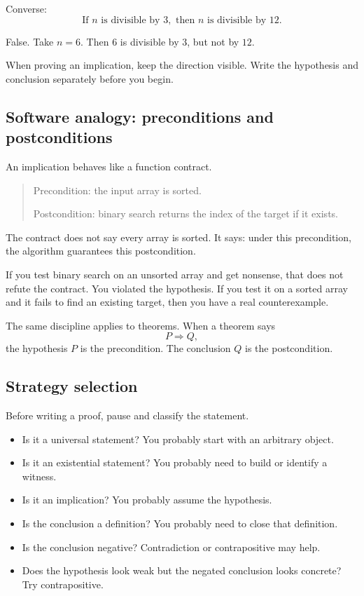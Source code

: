 Converse:
\[
\text{If }n\text{ is divisible by }3,\text{ then }n\text{ is divisible by }12.
\]

False. Take $n=6$. Then $6$ is divisible by $3$, but not by $12$.

\begin{trapbox}
When proving an implication, keep the direction visible. Write the hypothesis and conclusion separately before you begin.
\end{trapbox}

\subsection{Software analogy: preconditions and postconditions}

An implication behaves like a function contract.

\begin{quote}
Precondition: the input array is sorted.

Postcondition: binary search returns the index of the target if it exists.
\end{quote}

The contract does not say every array is sorted. It says: under this precondition, the algorithm guarantees this postcondition.

If you test binary search on an unsorted array and get nonsense, that does not refute the contract. You violated the hypothesis. If you test it on a sorted array and it fails to find an existing target, then you have a real counterexample.

The same discipline applies to theorems. When a theorem says
\[
P\Rightarrow Q,
\]
the hypothesis $P$ is the precondition. The conclusion $Q$ is the postcondition.

\subsection{Strategy selection}

Before writing a proof, pause and classify the statement.

\begin{itemize}
\item Is it a universal statement? You probably start with an arbitrary object.
\item Is it an existential statement? You probably need to build or identify a witness.
\item Is it an implication? You probably assume the hypothesis.
\item Is the conclusion a definition? You probably need to close that definition.
\item Is the conclusion negative? Contradiction or contrapositive may help.
\item Does the hypothesis look weak but the negated conclusion looks concrete? Try contrapositive.
\end{itemize}

